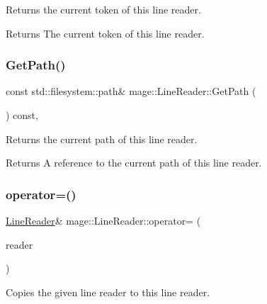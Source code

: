 Returns the current token of this line reader.

\begin{DoxyReturn}{Returns}
The current token of this line reader. 
\end{DoxyReturn}
\mbox{\label{classmage_1_1_line_reader_a9740b3cecdcf5a27c696a08eef3b09da}} 
\subsubsection{\texorpdfstring{Get\+Path()}{GetPath()}}
{\footnotesize\ttfamily const std\+::filesystem\+::path\& mage\+::\+Line\+Reader\+::\+Get\+Path (\begin{DoxyParamCaption}{ }\end{DoxyParamCaption}) const\hspace{0.3cm}{\ttfamily [protected]}, {\ttfamily [noexcept]}}

Returns the current path of this line reader.

\begin{DoxyReturn}{Returns}
A reference to the current path of this line reader. 
\end{DoxyReturn}
\mbox{\label{classmage_1_1_line_reader_a2247078d0b5602f9a9a6b74019832faf}} 
\subsubsection{\texorpdfstring{operator=()}{operator=()}\hspace{0.1cm}{\footnotesize\ttfamily [1/2]}}
{\footnotesize\ttfamily \mbox{\hyperlink{classmage_1_1_line_reader}{Line\+Reader}}\& mage\+::\+Line\+Reader\+::operator= (\begin{DoxyParamCaption}\item[{const \mbox{\hyperlink{classmage_1_1_line_reader}{Line\+Reader}} \&}]{reader }\end{DoxyParamCaption})\hspace{0.3cm}{\ttfamily [delete]}}

Copies the given line reader to this line reader.


